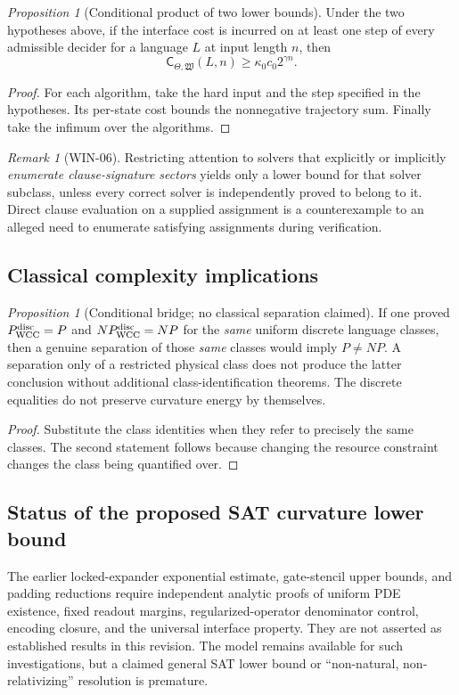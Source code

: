 \documentclass[12pt]{article}
\theoremstyle{remark}
\newtheorem*{remark}{Remark}
\newtheorem{proposition}[theorem]{Proposition}
\begin{document}
\begin{proposition}[Conditional product of two lower bounds]
\label{lem:lower}
Under the two hypotheses above, if the interface cost is incurred
on at least one step of every admissible decider for a language
$L$ at input length $n$, then
\[
\mathsf C_{\Theta,\mathfrak W}(L,n)
\ge \kappa_0c_0 2^{\gamma n}.
\]
\end{proposition}
\begin{proof}
For each algorithm, take the hard input and the step specified in
the hypotheses. Its per-state cost bounds the nonnegative trajectory
sum. Finally take the infimum over the algorithms.
\end{proof}
\begin{remark}[WIN-06]
Restricting attention to solvers that explicitly or implicitly
\emph{enumerate clause-signature sectors} yields only a lower bound
for that solver subclass, unless every correct solver is independently
proved to belong to it. Direct clause evaluation on a supplied
assignment is a counterexample to an alleged need to enumerate
satisfying assignments during verification.
\end{remark}

\subsection{Classical complexity implications}
\begin{proposition}[Conditional bridge; no classical separation claimed]
\label{cor:P-neq-NP-conditional}
If one proved $P_{\rm WCC}^{\rm disc}=P$ and
$NP_{\rm WCC}^{\rm disc}=NP$ for the \emph{same} uniform
discrete language classes, then a genuine separation of those
\emph{same} classes would imply $P\ne NP$.
A separation only of a restricted physical class does not produce
the latter conclusion without additional class-identification
theorems. The discrete equalities do not preserve curvature energy
by themselves.
\end{proposition}
\begin{proof}
Substitute the class identities when they refer to precisely the
same classes. The second statement follows because changing the
resource constraint changes the class being quantified over.
\end{proof}
\subsection{Status of the proposed SAT curvature lower bound}
The earlier locked-expander exponential estimate, gate-stencil
upper bounds, and padding reductions require independent analytic
proofs of uniform PDE existence, fixed readout margins,
regularized-operator denominator control, encoding closure, and the
universal interface property. They are not asserted as established
results in this revision. The model remains available for such
investigations, but a claimed general SAT lower bound or
``non-natural, non-relativizing'' resolution is premature.
\end{document}
